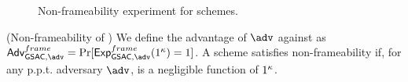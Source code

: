 \begin{figure}[htp!]
  \caption{Non-frameability experiment for \GSAC schemes.}
  \label{fig:exp-gsac-frame}
\end{figure}

\begin{definition}{(Non-frameability of \GSAC)}
  \label{def:frame-gsac}
  We define the advantage \AdvGSACNonframe of $\adv$ against \ExpGSACNonframe as
  $\AdvGSACNonframe=\Pr\lbrack\ExpGSACNonframe(1^\secpar)=1\rbrack$.
  A \GSAC scheme satisfies non-frameability if, for any p.p.t. adversary $\adv$,
  \AdvNonframe is a negligible function of $1^\kappa$.
\end{definition}

